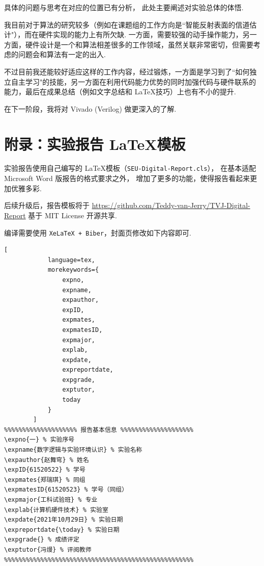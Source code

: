 \documentclass[11pt]{SEU-Digital-Report}
\begin{document}
        具体的问题与思考在对应的位置已有分析，
        此处主要阐述对实验总体的体悟.

        我目前对于算法的研究较多（例如在课题组的工作方向是``智能反射表面的信道估计"），而在硬件实现的能力上有所欠缺.
        一方面，需要较强的动手操作能力，另一方面，硬件设计是一个和算法相差很多的工作领域，虽然关联非常密切，但需要考虑的问题会和算法有一定的出入.

        不过目前我还能较好适应这样的工作内容，经过锻炼，一方面是学习到了``如何独立自主学习"的技能，另一方面在利用代码能力优势的同时加强代码与硬件联系的能力，最后在成果总结（例如文字总结和 \LaTeX 技巧）上也有不小的提升.

        在下一阶段，我将对 Vivado (Verilog) 做更深入的了解.

    \printbibliography

    \newpage
    \section*{附录：实验报告 \LaTeX 模板}

        实验报告使用自己编写的 \LaTeX 模板（\texttt{SEU-Digital-Report.cls}），
        在基本适配 Microsoft Word 版报告的格式要求之外，
        增加了更多的功能，使得报告看起来更加优雅多彩.

        后续升级后，报告模板将于 \url{https://github.com/Teddy-van-Jerry/TVJ-Digital-Report} 基于 MIT License 开源共享.

        编译需要使用 \texttt{XeLaTeX + Biber}，封面页修改如下内容即可.
        \begin{lstlisting}[
            language=tex,
            morekeywords={
                expno,
                expname,
                expauthor,
                expID,
                expmates,
                expmatesID,
                expmajor,
                explab,
                expdate,
                expreportdate,
                expgrade,
                exptutor,
                today
            }
        ]
%%%%%%%%%%%%%%%%%%%% 报告基本信息 %%%%%%%%%%%%%%%%%%%%
\expno{一} % 实验序号
\expname{数字逻辑与实验环境认识} % 实验名称
\expauthor{赵舞穹} % 姓名
\expID{61520522} % 学号
\expmates{郑瑞琪} % 同组
\expmatesID{61520523} % 学号（同组）
\expmajor{工科试验班} % 专业
\explab{计算机硬件技术} % 实验室
\expdate{2021年10月29日} % 实验日期
\expreportdate{\today} % 实验日期
\expgrade{} % 成绩评定
\exptutor{冯熳} % 评阅教师
%%%%%%%%%%%%%%%%%%%%%%%%%%%%%%%%%%%%%%%%%%%%%%%%%%%%
        \end{lstlisting}
\end{document}
